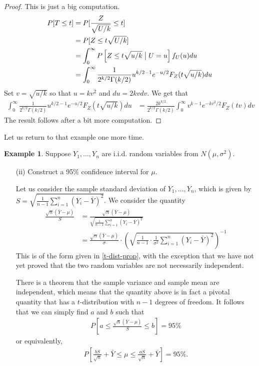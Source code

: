 \documentclass[11pt]{amsart}
\theoremstyle{definition}
\newtheorem{example}[theorem]{Example}
\numberwithin{equation}{section}
\begin{document}
\begin{proof}
    This is just a big computation.
    \begin{align*}
        P[T\le t]&=P[\frac{Z}{\sqrt{U/k}}\le t]\\
        &=P[Z\le t\sqrt{U/k}]\\
        &=\int_{0}^\infty P\left[ Z\le t\sqrt{u/k}\bigm|U=u\right]f_U(u)du\\
        &=\int_0^\infty \frac{1}{2^{k/2}\Gamma(k/2)}u^{k/2-1}e^{-u/2}F_Z(t\sqrt{u/k})du
    \end{align*}
    Set $v=\sqrt{u/k}$ so that $u=kv^2$ and $du=2kvdv$. We get that
    \begin{align*}
        \int_0^\infty \frac{1}{2^{k/2}\Gamma(k/2)}u^{k/2-1}e^{-u/2}F_Z(t\sqrt{u/k})du&=\frac{2k^{k/2}}{2^{k/2}\Gamma(k/2)}\int_0^\infty v^{k-1}e^{-kv^2/2}F_Z(tv)dv
    \end{align*}
    The result follows after a bit more computation.
\end{proof}
Let us return to that example one more time.
\setcounter{theorem}{35}
\begin{example}\label{pivotal-quantities}
    Suppose $Y_1,\ldots,Y_n$ are i.i.d. random variables from $N(\mu,\sigma^2)$.
    \begin{enumerate}
        \item [(ii)] Construct a 95\% confidence interval for $\mu$.
    
        Let us consider the sample standard deviation of $Y_1,\ldots,Y_n$, which is given by $S=\sqrt{\frac{1}{n-1}\sum_{i=1}^n(Y_i-\bar Y)^2}$. We consider the quantity
        \begin{align*}
            \frac{\sqrt{n}(\bar Y-\mu)}{S}&=\frac{\sqrt{n}(\bar Y-\mu)}{\sqrt{\frac{1}{n-1}\sum_{i=1}^n(Y_i-\bar Y)^2}}\\
            &=\frac{\sqrt{n}(\bar Y-\mu)}{\sigma}\cdot\left(\sqrt{\frac{1}{n-1}\cdot\frac{1}{\sigma^2}\sum_{i=1}^n(Y_i-\bar Y)^2}\right)^{-1}
        \end{align*}
        This is of the form given in \ref{t-dist-prop}, with the exception that we have not yet proved that the two random variables are not necessarily independent. 
        
        There is a theorem that the sample variance and sample mean are independent, which means that the quantity above is in fact a pivotal quantity that has a $t$-distribution with $n-1$ degrees of freedom. It follows that we can simply find $a$ and $b$ such that
        \begin{align*}
            P[a\le \frac{\sqrt{n}(\bar Y-\mu)}{S}\le b]=95\%
        \end{align*}
        or equivalently,
        \begin{align*}
            P[\frac{bS}{\sqrt{n}}+\bar Y\le \mu\le\frac{aS}{\sqrt{n}}+\bar Y]=95\%.
        \end{align*}
    \end{enumerate}
\end{example}
\newpage
\end{document}
